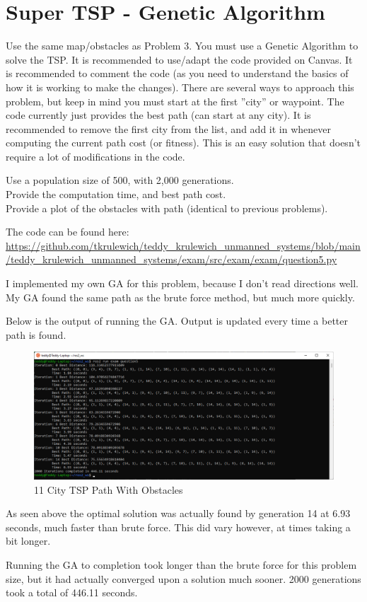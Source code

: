 \documentclass{article}
\begin{document}
\section{Super TSP - Genetic Algorithm}

Use the same map/obstacles as Problem 3. You must use a
Genetic Algorithm to solve the TSP. It is recommended to use/adapt the code provided on Canvas. It
is recommended to comment the code (as you need to understand the basics of how it is working to
make the changes). There are several ways to approach this problem, but keep in mind you must start
at the first ”city” or waypoint. The code currently just provides the best path (can start at any city).
It is recommended to remove the first city from the list, and add it in whenever computing the current
path cost (or fitness). This is an easy solution that doesn’t require a lot of modifications in the code.

\bigskip
\noindent Use a population size of 500, with 2,000 generations. \\
Provide the computation time, and best path cost. \\
Provide a plot of the obstacles with path (identical to previous problems).

\bigskip
\noindent The code can be found here: \\
\url{https://github.com/tkrulewich/teddy_krulewich_unmanned_systems/blob/main/teddy_krulewich_unmanned_systems/exam/src/exam/exam/question5.py}

\bigskip
\noindent I implemented my own GA for this problem, because I don't read directions well.
My GA found the same path as the brute force method, but much more quickly.

\bigskip
\noindent Below is the output of running the GA. Output is updated every time a better path is found.
\begin{figure}[H]
\centering
\includegraphics[width=1.0\textwidth]{images/question5-console.png}
\caption*{11 City TSP Path With Obstacles}
\end{figure}

As seen above the optimal solution was actually found by generation 14 at 6.93 seconds, much faster than brute force. This did vary however, at times taking a bit longer.

Running the GA to completion took longer than the brute force for this problem size, but it had actually converged upon a solution much sooner. 2000 generations took a total of 446.11 seconds.
\end{document}
